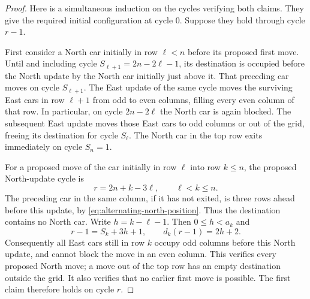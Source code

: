 \documentclass[reqno]{amsart}
\begin{document}
\begin{proof}
Here is a simultaneous induction on the cycles verifying both claims.
They give the required initial configuration at cycle $0$. Suppose they
hold through cycle $r-1$.

First consider a North car initially in row $\ell<n$ before its proposed
first move. Until and including cycle $S_{\ell+1}=2n-2\ell-1$, its destination
is occupied before the North update by the North car initially just above
it. That preceding car moves on cycle $S_{\ell+1}$. The East update of
the same cycle moves the surviving East cars in row $\ell+1$ from odd
to even columns, filling every even column of that row. In particular,
on cycle $2n-2\ell$
the North car is again blocked. The subsequent East update moves those
East cars to odd columns or out of the grid, freeing its destination
for cycle $S_\ell$.
The North car in the top row exits immediately on cycle $S_n=1$.

For a proposed move of the car initially in row $\ell$ into row $k\leq n$,
the proposed North-update cycle is
\[
    r=2n+k-3\ell,\qquad \ell<k\leq n.
\]
The preceding car in the same column, if it has not exited, is three
rows ahead before this update, by \eqref{eq:alternating-north-position}.
Thus the destination contains no North car. Write $h=k-\ell-1$.
Then $0\leq h<a_k$ and
\[
    r-1=S_k+3h+1,\qquad d_k(r-1)=2h+2.
\]
Consequently all East cars still in row $k$ occupy odd columns before
this North update, and cannot block the move in an even column. This
verifies every proposed North move; a move out of the top row has an
empty destination outside the grid. It also verifies that no earlier
first move is possible. The first claim therefore holds on cycle $r$.


\end{proof}
\end{document}
